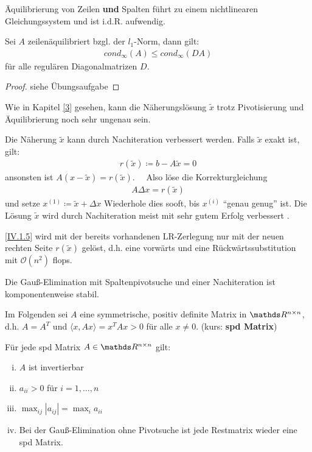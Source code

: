 Äquilibrierung von Zeilen \textbf{und} Spalten 
führt zu einem nichtlinearen Gleichungssystem und ist i.d.R. aufwendig.


\begin{Leme}
  \label{4.3.1}
  Sei $A$ zeilenäquilibriert bzgl. der $l_1$-Norm, dann gilt:
  \begin{gather}
    cond_{\infty}(A) \leq cond_{\infty}(DA)  \label{IV.1.3}
  \end{gather}
  für alle regulären Diagonalmatrizen $D$.
\end{Leme} 

\begin{proof}
  siehe Übungsaufgabe
\end{proof}

Wie in Kapitel \ref{3} gesehen, kann die Näherungslösung $\tilde{x}$ 
trotz Pivotisierung und Äquilibrierung noch sehr ungenau sein.


 
Die Näherung $\tilde{x}$ kann durch Nachiteration verbessert werden.
Falls $\tilde{x}$ exakt ist, gilt:
\begin{gather}
  r(\tilde{x}) \coloneqq b-A\tilde{x} =0 \label{IV.1.4}
\end{gather}
ansonsten ist $A(x-\tilde{x})=r(\tilde{x}).$ \ \
Also löse die Korrekturgleichung
\begin{gather}
  A\Delta x = r(\tilde{x}) 	\label{IV.1.5}
\end{gather}
und setze $x^{(1)} \coloneqq \tilde{x} +\Delta x$
Wiederhole dies sooft, bis $x^{(i)}$ \enquote{genau genug} ist.
Die Lösung $\tilde{x}$ wird durch Nachiteration 
meist mit sehr gutem Erfolg verbessert
\cite[genaueres in ][]{dahmenreusken}.

\eqref{IV.1.5} wird mit der bereits vorhandenen LR-Zerlegung
nur mit der neuen rechten Seite $r(\tilde{x})$ gelöst, 
d.h. eine vorwärts und eine Rückwärtssubstitution
mit $\mathcal{O}(n^2)$ flops.


\begin{Beme}
  Die Gauß-Elimination mit Spaltenpivotsuche und einer Nachiteration
  ist komponentenweise stabil.
\end{Beme}


Im Folgenden sei $A$ eine symmetrische, positiv definite Matrix in $\Renn $, d.h.
$A=A^T$ und $\langle x, Ax \rangle = x^TAx > 0$ für alle $ x\neq 0$. 
(kurs: \textbf{spd Matrix}) \index{spd Matrix}

\begin{Satze}
  \label{4.2.1}
  Für jede spd Matrix $A\in \Renn $ gilt:
  \begin{enumerate}[i)]	
  \item $A$ ist invertierbar
  \item $a_{ii}>0$ für $i=1, \dotsc , n$
  \item $\max_{ij}|a_{ij}| = \max_{i}a_{ii}$
  \item Bei der Gauß-Elimination ohne Pivotsuche 
    ist jede Restmatrix wieder eine spd Matrix.
  \end{enumerate}
\end{Satze}

